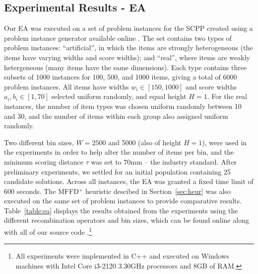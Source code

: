 \documentclass[authoryear]{elsarticle}
\begin{document}
\subsection{Experimental Results - EA}
\label{sub:expea}
\noindent Our EA was executed on a set of problem instances for the SCPP created using a problem instance generator available online \citep{hawa2019inst}. The set contains two types of problem instances: ``artificial'', in which the items are strongly heterogeneous (the items have varying widths and score widths); and ``real'', where items are weakly hetergeneous (many items have the same dimensions). Each type contains three subsets of 1000 instances for 100, 500, and 1000 items, giving a total of 6000 problem instances. All items have widths $w_i \in [150,1000]$ and score widths $a_i, b_i \in [1,70]$ selected uniform randomly, and equal height $H=1$. For the real instances, the number of item types was chosen uniform randomly between 10 and 30, and the number of items within each group also assigned uniform randomly.

Two different bin sizes, $W = 2500$ and 5000 (also of height $H=1$), were used in the experiments in order to help alter the number of items per bin, and the minimum scoring distance $\tau$ was set to 70mm -- the industry standard. After preliminary experiments, we settled for an initial population containing 25 candidate solutions. Across all instances, the EA was granted a fixed time limit of 600 seconds. The MFFD$^+$ heuristic descibed in Section~\ref{sec:heur} was also executed on the same set of problem instances to provide comparative results. Table~\ref{table:ea} displays the results obtained from the experiments using the different recombination operators and bin sizes, which can be found online along with all of our source code \citep{hawa2019ea}.\footnote{All experiments were implemented in C++ and executed on Windows machines with Intel Core i3-2120 3.30GHz processors and 8GB of RAM.}
\end{document}

